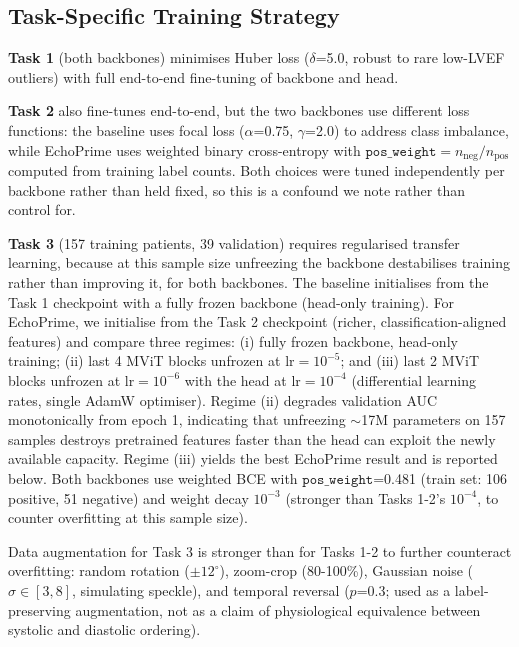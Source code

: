 \documentclass[runningheads]{llncs}
\begin{document}
\subsection{Task-Specific Training Strategy}

\noindent\textbf{Task 1} (both backbones) minimises Huber loss ($\delta$=5.0, robust to rare low-LVEF outliers) with full end-to-end fine-tuning of backbone and head.

\noindent\textbf{Task 2} also fine-tunes end-to-end, but the two backbones use different loss functions: the baseline uses focal loss ($\alpha$=0.75, $\gamma$=2.0) to address class imbalance, while EchoPrime uses weighted binary cross-entropy with $\texttt{pos\_weight} = n_\text{neg}/n_\text{pos}$ computed from training label counts. Both choices were tuned independently per backbone rather than held fixed, so this is a confound we note rather than control for.

\noindent\textbf{Task 3} (157 training patients, 39 validation) requires regularised transfer learning, because at this sample size unfreezing the backbone destabilises training rather than improving it, for both backbones. The baseline initialises from the Task 1 checkpoint with a fully frozen backbone (head-only training). For EchoPrime, we initialise from the Task 2 checkpoint (richer, classification-aligned features) and compare three regimes: (i) fully frozen backbone, head-only training; (ii) last 4 MViT blocks unfrozen at $\text{lr}=10^{-5}$; and (iii) last 2 MViT blocks unfrozen at $\text{lr}=10^{-6}$ with the head at $\text{lr}=10^{-4}$ (differential learning rates, single AdamW optimiser). Regime (ii) degrades validation AUC monotonically from epoch 1, indicating that unfreezing $\sim$17M parameters on 157 samples destroys pretrained features faster than the head can exploit the newly available capacity. Regime (iii) yields the best EchoPrime result and is reported below. Both backbones use weighted BCE with $\texttt{pos\_weight}$=0.481 (train set: 106 positive, 51 negative) and weight decay $10^{-3}$ (stronger than Tasks 1-2's $10^{-4}$, to counter overfitting at this sample size).

Data augmentation for Task 3 is stronger than for Tasks 1-2 to further counteract overfitting: random rotation ($\pm 12^\circ$), zoom-crop (80-100\%), Gaussian noise ($\sigma \in [3,8]$, simulating speckle), and temporal reversal ($p$=0.3; used as a label-preserving augmentation, not as a claim of physiological equivalence between systolic and diastolic ordering).
\end{document}
